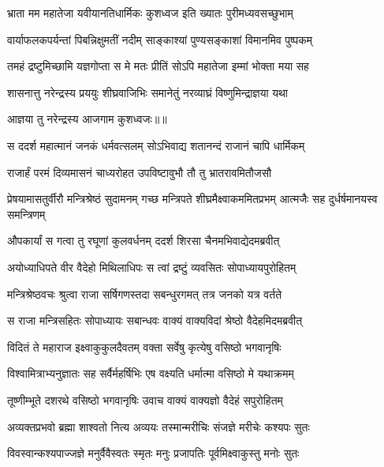 \twolineshloka
{भ्राता मम महातेजा यवीयानतिधार्मिकः}
{कुशध्वज इति ख्यातः पुरीमध्यवसच्छुभाम्} %

\twolineshloka
{वार्याफलकपर्यन्तां पिबन्निक्षुमतीं नदीम्}
{साङ्काश्यां पुण्यसङ्काशां विमानमिव पुष्पकम्} %

\twolineshloka
{तमहं द्रष्टुमिच्छामि यज्ञगोप्ता स मे मतः}
{प्रीतिं सोऽपि महातेजा इम्मां भोक्ता मया सह} %

\twolineshloka
{शासनात्तु नरेन्द्रस्य प्रययुः शीघ्रवाजिभिः}
{समानेतुं नरव्याघ्रं विष्णुमिन्द्राज्ञया यथा} %

{आज्ञया तु नरेन्द्रस्य आजगाम कुशध्वजः॥॥} %

\addtocounter{shlokacount}{1}

\twolineshloka
{स ददर्श महात्मानं जनकं धर्मवत्सलम्}
{सोऽभिवाद्य शतानन्दं राजानं चापि धार्मिकम्} %

\twolineshloka
{राजार्हं परमं दिव्यमासनं चाध्यरोहत}
{उपविष्टावुभौ तौ तु भ्रातरावमितौजसौ} %

\threelineshloka
{प्रेषयामासतुर्वीरौ मन्त्रिश्रेष्ठं सुदामनम्}
{गच्छ मन्त्रिपते शीघ्रमैक्ष्वाकममितप्रभम्}
{आत्मजैः सह दुर्धर्षमानयस्व समन्त्रिणम्} %

\twolineshloka
{औपकार्यां स गत्वा तु रघूणां कुलवर्धनम्}
{ददर्श शिरसा चैनमभिवाद्येदमब्रवीत्} %

\twolineshloka
{अयोध्याधिपते वीर वैदेहो मिथिलाधिपः}
{स त्वां द्रष्टुं व्यवसितः सोपाध्यायपुरोहितम्} %

\twolineshloka
{मन्त्रिश्रेष्ठवचः श्रुत्वा राजा सर्षिगणस्तदा}
{सबन्धुरगमत् तत्र जनको यत्र वर्तते} %

\twolineshloka
{स राजा मन्त्रिसहितः सोपाध्यायः सबान्धवः}
{वाक्यं वाक्यविदां श्रेष्ठो वैदेहमिदमब्रवीत्} %

\twolineshloka
{विदितं ते महाराज इक्ष्वाकुकुलदैवतम्}
{वक्ता सर्वेषु कृत्येषु वसिष्ठो भगवानृषिः} %

\twolineshloka
{विश्वामित्राभ्यनुज्ञातः सह सर्वैर्महर्षिभिः}
{एष वक्ष्यति धर्मात्मा वसिष्ठो मे यथाक्रमम्} %

\twolineshloka
{तूष्णीम्भूते दशरथे वसिष्ठो भगवानृषिः}
{उवाच वाक्यं वाक्यज्ञो वैदेहं सपुरोहितम्} %

\twolineshloka
{अव्यक्तप्रभवो ब्रह्मा शाश्वतो नित्य अव्ययः}
{तस्मान्मरीचिः संजज्ञे मरीचेः कश्यपः सुतः} %

\twolineshloka
{विवस्वान्कश्यपाज्जज्ञे मनुर्वैवैस्वतः स्मृतः}
{मनुः प्रजापतिः पूर्वमिक्ष्वाकुस्तु मनोः सुतः} %

